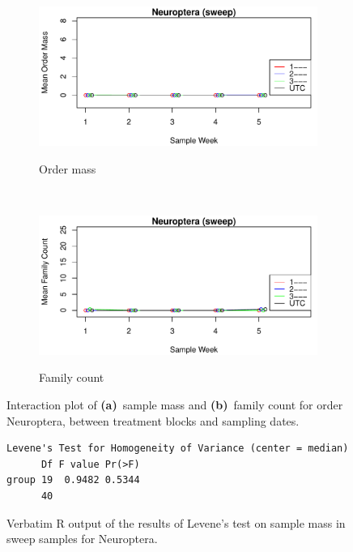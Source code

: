\documentclass[10pt,letterpaper,twocolumn]{article}
\begin{document}
\begin{figure}[h]
	\centering
	\begin{subfigure}[b]{0.45\textwidth}
		\caption{Order mass}
		\includegraphics[width=\textwidth]{plots/blocks/interaction/mass/mass_sweep_Neuroptera_interplot.pdf}
		\label{fig:sweep_neuroptera_mass_interplot}
	\end{subfigure}
	~
	\begin{subfigure}[b]{0.45\textwidth}
		\caption{Family count}
		\includegraphics[width=\textwidth]{plots/blocks/interaction/family/family_sweep_Neuroptera_interplot.pdf}
		\label{fig:sweep_neuroptera_family_interplot}
	\end{subfigure}
	\caption{Interaction plot of \textbf{(a)}~sample mass and \textbf{(b)}~family count for order Neuroptera, between treatment blocks and sampling dates.}
	\label{fig:sweep_neuroptera_interplot}
	\smallskip
	\nointerlineskip
	\hrulefill
\end{figure}

\begin{figure}[h]
	\lstset{numbers=left}
	\lstset{xleftmargin=5mm,framexleftmargin=5mm}
	\begin{lstlisting}
Levene's Test for Homogeneity of Variance (center = median)
      Df F value Pr(>F)
group 19  0.9482 0.5344
      40               
	\end{lstlisting}
	\caption{Verbatim R output of the results of Levene's test on sample mass in sweep samples for Neuroptera.}
	\label{fig:sweep_neuroptera_mass_levene}
	\smallskip
	\nointerlineskip
	\hrulefill
\end{figure}
\end{document}
